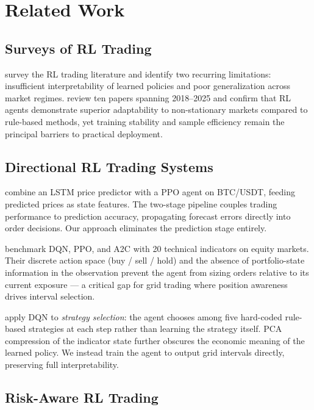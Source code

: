 \documentclass[11pt, a4paper]{article}
\begin{document}
\section{Related Work}

\subsection{Surveys of RL Trading}

\citet{sun2023rl} survey the RL trading literature and identify two recurring
limitations: insufficient interpretability of learned policies and poor
generalization across market regimes.
\citet{liu2025review} review ten papers spanning 2018--2025 and confirm that RL
agents demonstrate superior adaptability to non-stationary markets compared to
rule-based methods, yet training stability and sample efficiency remain the
principal barriers to practical deployment.

\subsection{Directional RL Trading Systems}

\citet{liu2021bitcoin} combine an LSTM price predictor with a PPO agent on
BTC/USDT, feeding predicted prices as state features.
The two-stage pipeline couples trading performance to prediction accuracy,
propagating forecast errors directly into order decisions.
Our approach eliminates the prediction stage entirely.

\citet{yasin2024rl} benchmark DQN, PPO, and A2C with 20 technical indicators on
equity markets.
Their discrete action space (buy / sell / hold) and the absence of portfolio-state
information in the observation prevent the agent from sizing orders relative to
its current exposure — a critical gap for grid trading where position awareness
drives interval selection.

\citet{pham2025dqn} apply DQN to \emph{strategy selection}: the agent chooses
among five hard-coded rule-based strategies at each step rather than learning
the strategy itself.
PCA compression of the indicator state further obscures the economic meaning of
the learned policy.
We instead train the agent to output grid intervals directly, preserving full
interpretability.

\subsection{Risk-Aware RL Trading}
\end{document}

